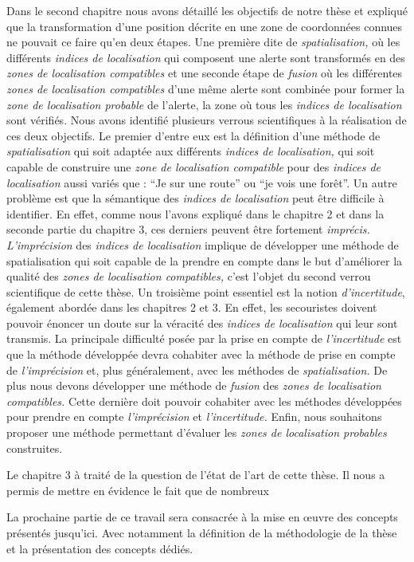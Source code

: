 Dans le second chapitre nous avons détaillé les objectifs de notre
thèse et expliqué que la transformation d'une position décrite en une
zone de coordonnées connues ne pouvait ce faire qu'en deux étapes. Une
première dite de \emph{spatialisation,} où les différents
\emph{indices de localisation} qui composent une alerte sont
transformés en des \emph{zones de localisation compatibles} et une
seconde étape de \emph{fusion} où les différentes \emph{zones de
  localisation compatibles} d'une même alerte sont combinée pour
former la \emph{zone de localisation probable} de l'alerte, \ie la
zone où tous les \emph{indices de localisation} sont vérifiés. Nous
avons identifié plusieurs verrous scientifiques à la réalisation de
ces deux objectifs. Le premier d'entre eux est la définition d'une
méthode de \emph{spatialisation} qui soit adaptée aux différents
\emph{indices de localisation,} \ie qui soit capable de construire une
\emph{zone de localisation compatible} pour des \emph{indices de
  localisation} aussi variés que : \enquote{Je sur une route} ou
\enquote{je vois une forêt}.  Un autre problème est que la sémantique
des \emph{indices de localisation} peut être difficile à
identifier. En effet, comme nous l'avons expliqué dans le chapitre 2
et dans la seconde partie du chapitre 3, ces derniers peuvent être
fortement \emph{imprécis.}  \emph{L'imprécision} des \emph{indices de
  localisation} implique de développer une méthode de spatialisation
qui soit capable de la prendre en compte dans le but d'améliorer la
qualité des \emph{zones de localisation compatibles,} c'est l'objet du
second verrou scientifique de cette thèse.  Un troisième point
essentiel est la notion \emph{d'incertitude}, également abordée dans
les chapitres 2 et 3. En effet, les secouristes doivent pouvoir
énoncer un doute sur la véracité des \emph{indices de localisation}
qui leur sont transmis. La principale difficulté posée par la prise en
compte de \emph{l'incertitude} est que la méthode développée devra
cohabiter avec la méthode de prise en compte de \emph{l'imprécision}
et, plus généralement, avec les méthodes de \emph{spatialisation.}  De
plus nous devons développer une méthode de \emph{fusion} des
\emph{zones de localisation compatibles.} Cette dernière doit pouvoir
cohabiter avec les méthodes développées pour prendre en compte
\emph{l'imprécision} et \emph{l'incertitude.} Enfin, nous souhaitons
proposer une méthode permettant d'évaluer les \emph{zones de
  localisation probables} construites.

Le chapitre 3 à traité de la question de l'état de l'art de cette
thèse. Il nous a permis de mettre en évidence le fait que de nombreux 

La prochaine partie de ce travail sera consacrée à la mise en œuvre
des concepts présentés jusqu'ici. Avec notamment la définition de la
méthodologie de la thèse et la présentation des concepts dédiés.


